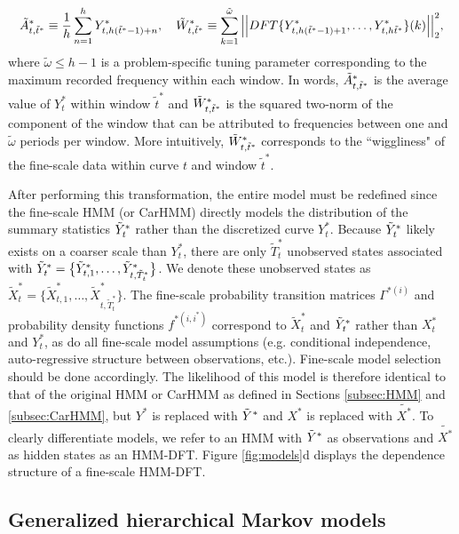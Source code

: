 \begin{equation}
    \label{eqn:z}
    \Zone_{t,\tilde{t}^*} \equiv \frac{1}{h}\sum_{n=1}^{h}Y^*_{t,h(\tilde{t}^*-1)+n}, \quad \Ztwo_{t,\tilde{t}^*} \equiv \sum_{k=1}^{\tilde{\omega}}\Big|\Big|DFT\{Y^*_{t,h(\tilde{t}^*-1)+1},\ldots, Y^*_{t,h\tilde{t}^*}\}(k)\Big|\Big|_2^2,
\end{equation}
%
where $\tilde{\omega} \leq h-1$ is a problem-specific tuning parameter corresponding to the maximum recorded frequency within each window. In words, $\tilde{A}^*_{t,\tilde{t}^*}$ is the average value of $Y^*_t$ within window $\tilde{t}^*$ and $\tilde{W}^*_{t,\tilde{t}^*}$ is the squared two-norm of the component of the window that can be attributed to frequencies between one and $\tilde{\omega}$ periods per window. More intuitively, $\tilde{W}^*_{t,\tilde{t}^*}$ corresponds to the ``wiggliness" of the fine-scale data within curve $t$ and window $\tilde{t}^*$.

After performing this transformation, the entire model must be redefined since the fine-scale HMM (or CarHMM) directly models the distribution of the summary statistics $\tilde{Y}^*_t$ rather than the discretized curve $Y^*_t$. Because $\tilde{Y}^*_t$ likely exists on a coarser scale than $Y^*_t$, there are only $\tilde{T}_t^*$ unobserved states associated with $\tilde{Y}^*_t = \big\{\tilde{Y}^*_{t,1},\ldots, \tilde{Y}^*_{t,\tilde{T}^*_t}\big\}$. We denote these unobserved states as $\tilde{X}^*_t = \big\{\tilde{X}^*_{t,1},\ldots, \tilde{X}^*_{t,\tilde{T}^*_t}\big\}$. The fine-scale probability transition matrices $\Gamma^{*(i)}$ and probability density functions $f^{*(i,i^*)}$ correspond to $\tilde{X}^*_t$ and $\tilde{Y}^*_t$ rather than $X^*_t$ and $Y^*_t$, as do all fine-scale model assumptions (e.g. conditional independence, auto-regressive structure between observations, etc.). Fine-scale model selection should be done accordingly. %
The likelihood of this model is therefore identical to that of the original HMM or CarHMM as defined in Sections \ref{subsec:HMM} and \ref{subsec:CarHMM}, but $Y^*$ is replaced with $\tilde{Y}^*$ and $X^*$ is replaced with $\tilde{X^*}$. To clearly differentiate models, we refer to an HMM with $\tilde{Y}^*$ as observations and $\tilde{X^*}$ as hidden states as an HMM-DFT. Figure \ref{fig:models}d displays the dependence structure of a fine-scale HMM-DFT.

\subsection{Generalized hierarchical Markov models}

